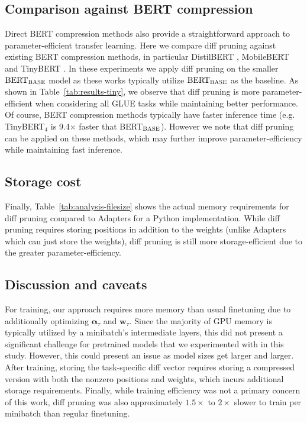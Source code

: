 \subsection{Comparison against BERT compression}

Direct BERT compression methods also provide a straightforward approach to parameter-efficient transfer learning. Here we compare diff pruning against existing BERT compression methods, in particular DistilBERT \citep{sanh2019distil}, MobileBERT \citep{sun-etal-2020-mobilebert} and TinyBERT \citep{jiao2019tiny}. In these experiments we apply diff pruning on the smaller $\text{BERT}_{\textsc{BASE}}$ model as these works typically utilize $\text{BERT}_{\textsc{BASE}}$ as the baseline. As shown in Table~\ref{tab:results-tiny}, we observe that diff pruning is more parameter-efficient when considering all GLUE tasks while maintaining better performance. Of course, BERT compression methods typically have faster inference time (e.g. TinyBERT$_{4}$ is 9.4$\times$ faster that BERT$_{\textsc{BASE}}$). However we note that  diff pruning can be applied on these methods, which may further improve parameter-efficiency while maintaining fast inference.

\subsection{Storage cost}
\label{sec:storage}
Finally, Table~\ref{tab:analysis-filesize} shows the actual memory requirements for diff pruning compared to Adapters for a Python implementation. While diff pruning requires storing positions in addition to the weights (unlike Adapters which can just store the weights), diff pruning is still more storage-efficient due to the greater parameter-efficiency.

\subsection{Discussion and caveats}

 For training, our approach requires more memory than usual finetuning due to additionally optimizing $\boldsymbol{\alpha}_\tau$ and $\mathbf{w}_\tau$.  Since the majority of GPU memory is typically utilized by a minibatch's intermediate layers, this did not present a significant challenge for pretrained models that we experimented with in this study. However, this could present an issue as model sizes get larger and larger. After training, storing the task-specific diff vector requires storing a compressed version with both the nonzero positions and weights, which incurs additional storage requirements. Finally, while training efficiency was not a primary concern of this work, diff pruning was also approximately $1.5\times$ to $2\times$ slower to train per minibatch than regular finetuning. 

